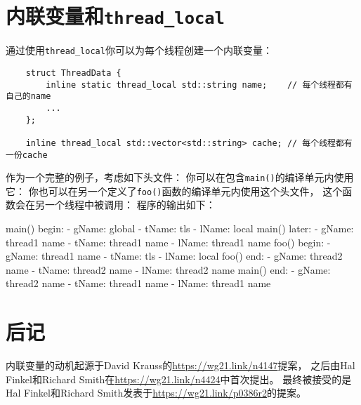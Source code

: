 \section{内联变量和\texttt{thread\_local}}
通过使用\texttt{thread\_local}你可以为每个线程创建一个内联变量：
\begin{lstlisting}
    struct ThreadData {
        inline static thread_local std::string name;    // 每个线程都有自己的name
        ...
    };

    inline thread_local std::vector<std::string> cache; // 每个线程都有一份cache
\end{lstlisting}
作为一个完整的例子，考虑如下头文件：
你可以在包含\texttt{main()}的编译单元内使用它：
你也可以在另一个定义了\texttt{foo()}函数的编译单元内使用这个头文件，
这个函数会在另一个线程中被调用：
程序的输出如下：
\begin{blacklisting}
    main() begin:
    - gName: global
    - tName: tls
    - lName: local
    main() later:
    - gName: thread1 name
    - tName: thread1 name
    - lName: thread1 name
    foo() begin:
    - gName: thread1 name
    - tName: tls
    - lName: local
    foo() end:
    - gName: thread2 name
    - tName: thread2 name
    - lName: thread2 name
    main() end:
    - gName: thread2 name
    - tName: thread1 name
    - lName: thread1 name
\end{blacklisting}

\section{后记}
内联变量的动机起源于David Krauss的\url{https://wg21.link/n4147}提案，
之后由Hal Finkel和Richard Smith在\url{https://wg21.link/n4424}中首次提出。
最终被接受的是Hal Finkel和Richard Smith发表于\url{https://wg21.link/p0386r2}的提案。